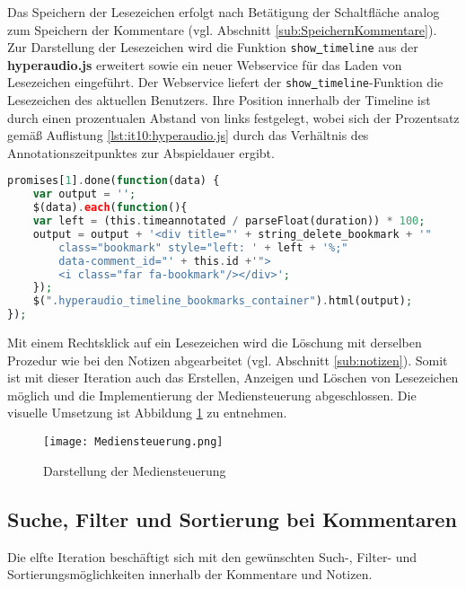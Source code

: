 Das Speichern der Lesezeichen erfolgt nach Betätigung der Schaltfläche analog zum Speichern der Kommentare (vgl. Abschnitt \ref{sub:SpeichernKommentare}). Zur Darstellung der Lesezeichen wird die Funktion \texttt{show\underline{{ }}timeline} aus der \textbf{hyperaudio.js} erweitert sowie ein neuer Webservice für das Laden von Lesezeichen eingeführt. Der Webservice liefert der \texttt{show\underline{{ }}timeline}-Funktion die Lesezeichen des aktuellen Benutzers. Ihre Position innerhalb der Timeline ist durch einen prozentualen Abstand von links festgelegt, wobei sich der Prozentsatz gemäß Auflistung \ref{lst:it10:hyperaudio.js} durch das Verhältnis des Annotationszeitpunktes zur Abspieldauer ergibt. 

\begin{lstlisting}[language=php,
             linewidth=\textwidth,
             caption={Ausschnitt der \textbf{hyperaudio.js} in der 10. Iteration},
             label={lst:it10:hyperaudio.js}]
promises[1].done(function(data) {
    var output = '';
    $(data).each(function(){
    var left = (this.timeannotated / parseFloat(duration)) * 100;
    output = output + '<div title="' + string_delete_bookmark + '" 
        class="bookmark" style="left: ' + left + '%;" 
        data-comment_id="' + this.id +'">
        <i class="far fa-bookmark"/></div>';
    });
    $(".hyperaudio_timeline_bookmarks_container").html(output);
});
\end{lstlisting}

Mit einem Rechtsklick auf ein Lesezeichen wird die Löschung mit derselben Prozedur wie bei den Notizen abgearbeitet (vgl. Abschnitt \ref{sub:notizen}). Somit ist mit dieser Iteration auch das Erstellen, Anzeigen und Löschen von Lesezeichen möglich und die Implementierung der Mediensteuerung abgeschlossen. Die visuelle Umsetzung ist Abbildung \ref{fig:Mediensteuerung} zu entnehmen.


\begin{figure}[h!]
\texttt{[image: Mediensteuerung.png]}
\caption{\label{fig:Mediensteuerung}Darstellung der Mediensteuerung}
\end{figure}


\subsection{Suche, Filter und Sortierung bei Kommentaren}
Die elfte Iteration beschäftigt sich mit den gewünschten Such-, Filter- und Sortierungsmöglichkeiten innerhalb der Kommentare und Notizen.

